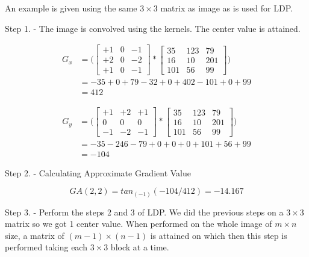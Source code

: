\documentclass[conference]{IEEEtran}
\begin{document}
An example is given using the same $3 \times 3$ matrix as image as is used for LDP.
\begin{center}
	Step 1. - The image is convolved using the kernels. The center value is attained.
\end{center}
\begin{center}
	\[
	\begin{split}
	G_x & = \Bigg(
	\begin{bmatrix}
		+1 & 0 & -1 \\
		+2 & 0 & -2 \\
		+1 & 0 & -1
	\end{bmatrix}
	*
	\begin{bmatrix}
		35 & 123 & 79 \\
		16 & 10 & 201 \\
		101 & 56 & 99
	\end{bmatrix}\Bigg) \\
	& = -35 + 0 + 79 - 32 + 0 + 402 - 101 + 0 + 99 \\
	& = 412
	\end{split}
	\]
	
	\[
	\begin{split}
	G_y & = \Bigg(
	\begin{bmatrix}
	+1 & +2 & +1 \\
	0 & 0 & 0 \\
	-1 & -2 & -1
	\end{bmatrix}
	*
	\begin{bmatrix}
	35 & 123 & 79 \\
	16 & 10 & 201 \\
	101 & 56 & 99
	\end{bmatrix}\Bigg) \\
	& = -35 - 246 - 79 + 0 + 0 + 0 + 101 + 56 + 99 \\
	& = -104
	\end{split}
	\]
\end{center}

\begin{center}
	Step 2. - Calculating Approximate Gradient Value\\
\end{center}
\[
	GA (2,2) = tan_(-1)(-104/412) = -14.167
\]
\begin{center}
	Step 3. - Perform the steps 2 and 3 of LDP. We did the previous steps on a $3 \times 3$ matrix so we got 1 center value. When performed on the whole image of $m \times n$ size, a matrix of $(m-1) \times (n-1)$ is attained on which then this step is performed taking each $3 \times 3$ block at a time.
\end{center}
\end{document}
